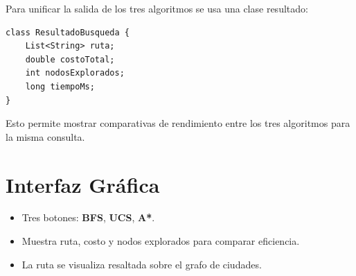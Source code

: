 \documentclass[12pt,a4paper]{article}
\begin{document}
Para unificar la salida de los tres algoritmos se usa una clase resultado:

\begin{lstlisting}
class ResultadoBusqueda {
    List<String> ruta;
    double costoTotal;
    int nodosExplorados;
    long tiempoMs;
}
\end{lstlisting}

Esto permite mostrar comparativas de rendimiento entre los tres algoritmos para la misma consulta.

\section{Interfaz Gráfica}

\begin{itemize}
  \item Tres botones: \textbf{BFS}, \textbf{UCS}, \textbf{A*}.
  \item Muestra ruta, costo y nodos explorados para comparar eficiencia.
  \item La ruta se visualiza resaltada sobre el grafo de ciudades.
\end{itemize}
\end{document}
